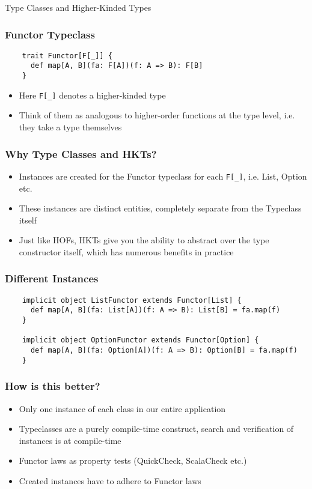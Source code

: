 \begin{section}{Type Classes and Higher-Kinded Types}
\begin{frame}[fragile]
  \frametitle{Functor Typeclass}
  \begin{verbatim}
    trait Functor[F[_]] {
      def map[A, B](fa: F[A])(f: A => B): F[B]
    }
  \end{verbatim}
  \begin{itemize}
  \item{Here \texttt{F[_]} denotes a higher-kinded type}
  \item Think of them as analogous to higher-order functions at the type level, i.e. they take a type themselves
  \end{itemize}
\end{frame}

\begin{frame}[fragile]
  \frametitle{Why Type Classes and HKTs?}
  \begin{itemize}
  \item Instances are created for the Functor typeclass for each \texttt{F[_]}, i.e. List, Option etc.
  \item These instances are distinct entities, completely separate from the Typeclass itself
  \item Just like HOFs, HKTs give you the ability to abstract over the type constructor itself, which has numerous benefits in practice
  \end{itemize}
\end{frame}

\begin{frame}[fragile]
  \frametitle{Different Instances}
  \begin{verbatim}
    implicit object ListFunctor extends Functor[List] {
      def map[A, B](fa: List[A])(f: A => B): List[B] = fa.map(f)
    }

    implicit object OptionFunctor extends Functor[Option] {
      def map[A, B](fa: Option[A])(f: A => B): Option[B] = fa.map(f)
    }
  \end{verbatim}
\end{frame}

\begin{frame}[fragile]
  \frametitle{How is this better?}
  \begin{itemize}
  \item Only one instance of each class in our entire application
  \item Typeclasses are a purely compile-time construct, search and verification of instances is at compile-time
  \item Functor laws as property tests (QuickCheck, ScalaCheck etc.)
  \item Created instances have to adhere to Functor laws
  \end{itemize}
\end{frame}


\end{section}
